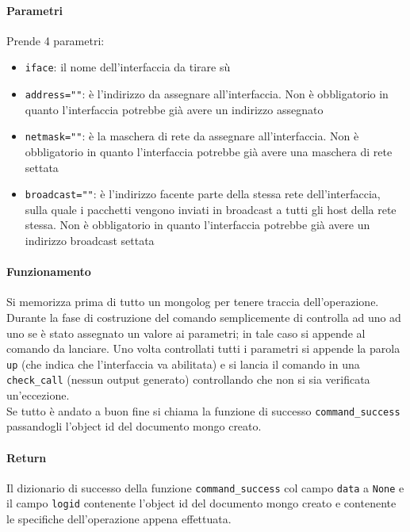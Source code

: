 \documentclass[11pt]{article}
\begin{document}
\paragraph{Parametri}
Prende 4 parametri:
\begin{itemize}
	\item{\texttt{iface}: il nome dell'interfaccia da tirare sù}
	\item{\texttt{address=""}: è l'indirizzo da assegnare all'interfaccia. Non è obbligatorio in quanto l'interfaccia
		potrebbe già avere un indirizzo assegnato}
	\item{\texttt{netmask=""}: è la maschera di rete da assegnare all'interfaccia. Non è obbligatorio in quanto l'interfaccia
		potrebbe già avere una maschera di rete settata}
	\item{\texttt{broadcast=""}: è l'indirizzo facente parte della stessa rete dell'interfaccia, sulla quale i pacchetti
		vengono inviati in broadcast a tutti gli host della rete stessa. Non è obbligatorio in quanto l'interfaccia
		potrebbe già avere un indirizzo broadcast settata}
\end{itemize}
\paragraph{Funzionamento}
Si memorizza prima di tutto un mongolog per tenere traccia dell'operazione.\\
Durante la fase di costruzione del comando semplicemente di controlla ad uno ad uno se è stato assegnato un valore ai parametri;
in tale caso si appende al comando da lanciare. Uno volta controllati tutti i parametri si appende la parola \texttt{up}
(che indica che l'interfaccia va abilitata) e si lancia il comando in una \texttt{check\_call} (nessun output generato)
controllando che non si sia verificata un'eccezione.\\
Se tutto è andato a buon fine si chiama la funzione di successo \texttt{command\_success} passandogli l'object id
del documento mongo creato.
\paragraph{Return}
Il dizionario di successo della funzione \texttt{command\_success} col campo \texttt{data} a \texttt{None} e il campo
\texttt{logid} contenente l'object id del documento mongo creato e contenente le specifiche dell'operazione appena effettuata.
\end{document}
